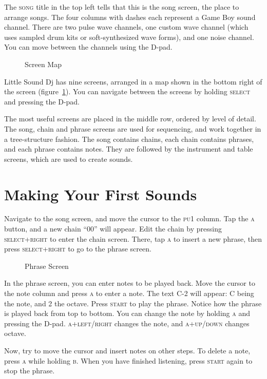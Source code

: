 The \textsc{song} title in the top left tells that this is the song screen,
the place to arrange songs. The four columns with dashes each represent a
Game Boy sound channel. There are two pulse wave channels, one custom wave channel
(which uses sampled drum kits or soft-synthesized wave forms), and one noise channel. You
can move between the channels using the D-pad.

\begin{figure}[hbtp]
\centering
{}
\caption{Screen Map}
\label{fig:map}
\end{figure}

Little Sound Dj has nine screens, arranged in a map shown in the
bottom right of the screen (figure~\ref{fig:map}). You can navigate between the screens by
holding \textsc{select} and pressing the D-pad.

The most useful screens are placed in the middle row, ordered by level of detail. 
The song, chain and phrase screens are used for sequencing, and work together in a tree-structure
fashion.  The song contains chains, each chain contains phrases, and each phrase contains notes.
They are followed by the instrument and table screens, which are used to create sounds.

\section{Making Your First Sounds}
Navigate to the song screen, and move the cursor to the \textsc{pu1} column. Tap the \textsc{a} button,
and a new chain ``00'' will appear.
Edit the chain by pressing \textsc{select+right} to enter the chain screen.
There, tap \textsc{a} to insert a new phrase, then press \textsc{select+right} to go to the phrase screen.

\begin{figure}[hbtp]
\centering
{}
\caption{Phrase Screen}
\label{fig:phrase1}
\end{figure}

In the phrase screen, you can enter notes to be played back. Move the cursor to the note
column and press \textsc{a} to enter a note. The text C-2 will appear: C being the note, and 2 the
octave. Press \textsc{start} to play the phrase. Notice how the phrase is played back from
top to bottom. You can change the note by holding \textsc{a} and pressing the
D-pad. \textsc{a+left/right} changes the note, and \textsc{a+up/down} changes octave.

Now, try to move the cursor and insert notes on other steps.
To delete a note, press \textsc{a} while holding \textsc{b}.
When you have finished listening, press \textsc{start} again to stop the phrase.

